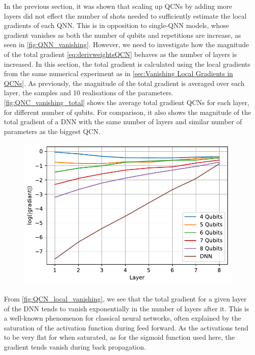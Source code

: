 In the previous section, it was shown that scaling up QCNs by adding more layers did not effect the number of shots needed to sufficiently estimate the local gradients of each QNN. This is in opposition to single-QNN models, whose gradient vanishes as both the number of qubits and repetitions are increase, as seen in \autoref{fig:QNN_vanishing}. However, we need to investigate how the magnitude of the total gradient \autoref{eq:derivweightsQCN} behaves as the number of layers is increased. In this section, the total gradient is calculated using the local gradients from the same numerical experiment as in \autoref{sec:Vanishing Local Gradients in QCNs}. As previously, the magnitude of the total gradient is averaged over each layer, the samples and 10 realisations of the parameters. \autoref{fig:QNC_vanishing_total} shows the average total gradient QCNs for each layer, for different number of qubits. For comparison, it also shows the magnitude of the total gradient of a DNN with the same number of layers and similar number of parameters as the biggest QCN.

\begin{figure}[H]
    \centering
    \includegraphics[width=12cm]{latex/figures/vanishing_gradient_total.pdf}
    \caption{}
    \label{fig:QNC_vanishing_total}
\end{figure}

From \autoref{fig:QCN_local_vanishing}, we see that the total gradient for a given layer of the DNN tends to vanish exponentially in the number of layers after it. This is a well-known phenomenon for classical neural networks, often explained by the saturation of the activation function during feed forward\cite{shalevshwartz2017failures}. As the activations tend to be very flat for when saturated, as for the sigmoid function used here, the gradient tends vanish during back propagation.

